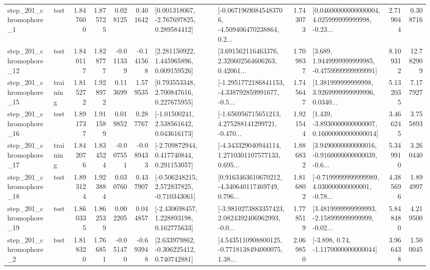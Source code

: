 \begin{tabular}{llrrrrllrlrr}
   step\_201\_chromophore\_1 &      test &      1.847600 &    1.875725 &      0.028125 &  0.401642 &    [0.001318067, -2.767697825, 0.289584412] &  [-0.06719690845483706, -4.509406470238864, 0.2... &       1.743073 &  [0.04600000000000004, 4.025999999999998, -0.23... &            2.719044 &          0.308716 \\
  step\_201\_chromophore\_12 &      test &      1.840117 &    1.828777 &     -0.011339 & -0.141568 &     [2.281150922, 1.445965896, 0.009159526] &  [3.691562116463376, 2.320602564606263, 0.42061... &       1.709837 &   [3.689, 1.9449999999999985, -0.4759999999999991] &            8.109312 &         12.782909 \\
  step\_201\_chromophore\_15 &  training &      1.815272 &    1.928972 &      0.113699 &  1.579535 &     [0.793553348, 2.700847616, 0.227675955] &  [-1.2951772186841153, -4.338792859991677, -0.5... &       1.745647 &  [1.381999999999998, 3.9269999999999996, 0.0340... &            5.132035 &          7.177927 \\
  step\_201\_chromophore\_16 &      test &      1.891737 &    1.911589 &      0.019852 &  0.287767 &     [-1.01500241, 2.538561642, 0.043616173] &  [-1.656956715651213, 4.275288141299721, -0.470... &       1.921544 &  [1.439, -3.8930000000000007, 0.16000000000000014] &            3.466245 &          3.755893 \\
  step\_201\_chromophore\_17 &  training &      1.842076 &    1.834524 &     -0.007551 & -0.089433 &    [-2.709872944, 0.417740844, 0.291153057] &  [-4.343329040944114, 1.2710301107577133, 0.695... &       1.886832 &  [3.9490000000000016, -0.9160000000000039, -0.6... &            5.349910 &          3.260440 \\
  step\_201\_chromophore\_18 &      test &      1.893124 &    1.923884 &      0.030760 &  0.437907 &   [-0.506248215, 2.572837825, -0.710343061] &  [0.9163463610670212, -4.340640117469749, 0.796... &       1.816802 &  [-0.7199999999999989, 4.030000000000001, -0.78... &            4.385696 &          1.894997 \\
  step\_201\_chromophore\_19 &      test &      1.860335 &    1.862539 &      0.002205 &  0.044857 &    [-2.430698457, 1.228893198, 0.162775633] &  [-3.9810273883357423, 2.0824392406962993, -0.0... &       1.778519 &  [3.4819999999999993, -2.158999999999999, -0.02... &            5.848480 &          4.219500 \\
   step\_201\_chromophore\_2 &      test &      1.818320 &    1.766851 &     -0.051470 & -0.693948 &    [2.633979862, -0.306225412, 0.740742881] &  [4.5435110908800125, -0.7718138494000075, 1.38... &       2.069850 &                [-3.898, 0.74, -1.1170000000000044] &            3.966438 &          1.500045 \\

\end{tabular}
